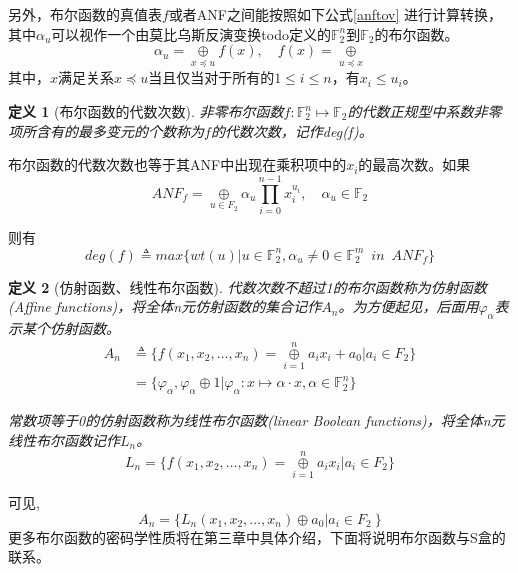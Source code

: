 \documentclass{xduugthesis}
\newtheorem{definition}{定义}
\begin{document}
另外，布尔函数的真值表$f$或者ANF之间能按照如下公式\ref{anftov} 进行计算转换，其中$\alpha_u$可以视作一个由莫比乌斯反演变换todo定义的$\mathbb{F}_2^n$到$\mathbb{F}_2$的布尔函数。
\begin{equation}
\alpha_u =\mathop{\oplus}\limits_{x\preceq u}f(x), \quad f(x)=\mathop{\oplus}\limits_{u\preceq x} \label{anftov}
\end{equation}
其中，$x$满足关系$x\preceq u$当且仅当对于所有的$1 \le i \le n$，有$x_i \le u_i$。\par

\begin{definition}[布尔函数的代数次数]
    非零布尔函数$f:\mathbb{F}_2^n \mapsto \mathbb{F}_2$的代数正规型中系数非零项所含有的最多变元的个数称为$f$的代数次数，记作deg(f)。
\end{definition}\par
布尔函数的代数次数也等于其ANF中出现在乘积项中的$x_i$的最高次数。如果
$$
ANF_f =\mathop{\oplus}\limits_{u \in F_2}\alpha_u \prod\limits_{i=0}^{n-1} x_i^{u_i},\quad \alpha_u \in \mathbb{F}_2
$$\par
则有
\begin{equation}\label{bfAlgebraicDegree}
    deg(f) \triangleq max\{wt(u)|u\in \mathbb{F}_2^n,\alpha_u \ne 0 \in \mathbb{F}_2^m \enspace in \enspace ANF_f \}
\end{equation}\par

\begin{definition}[仿射函数、线性布尔函数]
    代数次数不超过1的布尔函数称为仿射函数(Affine functions)，将全体n元仿射函数的集合记作$A_n$。为方便起见，后面用$\varphi_{\alpha}$表示某个仿射函数。
\begin{equation}\label{affine_func}
    \begin{aligned}
        A_n &\triangleq \{ f(x_1,x_2,\dots ,x_n) = \mathop{\oplus}\limits_{i=1}^n a_ix_i + a_0 |a_i \in F_2 \} \\
        &= \{\varphi_{\alpha}, \varphi_{\alpha} \oplus 1|\varphi_{\alpha}:x \mapsto \alpha \cdot x, \alpha \in \mathbb{F}_2^n \}          
    \end{aligned}
\end{equation}\par

常数项等于0的仿射函数称为线性布尔函数(linear Boolean functions)，将全体n元线性布尔函数记作$L_n$。
$$
L_n = \{ f(x_1,x_2,\dots ,x_n) = \mathop{\oplus}\limits_{i=1}^n a_ix_i |a_i \in F_2 \}
$$
\end{definition}\par
可见,
$$
A_n = \{ L_n(x_1,x_2,\dots ,x_n) \oplus a_0 |a_i \in F_2 \ \}
$$
更多布尔函数的密码学性质将在第三章中具体介绍，下面将说明布尔函数与S盒的联系。
\end{document}
